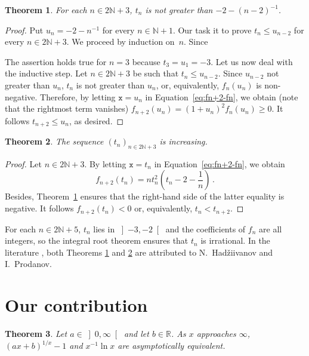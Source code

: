 \documentclass[12pt]{article}
\newcommand{\bR}{\mathbb{R}}
\newcommand{\bN}{\mathbb{N}}
\newcommand{\gtint}[1]{\left] #1, \infty \right[}
\newcommand{\ttx}{\mathtt{x}}
\newtheorem{theorem}{Theorem}
\begin{document}
 \begin{theorem} \label{thm:HP-upper}
   For each $n \in 2 \bN + 3$, $t_n$ is not greater than $- 2 - {(n - 2)}^{-1}$.
 \end{theorem}

 \begin{proof}
   Put $u_n = - 2 - n^{-1}$ for every $n \in \bN + 1$.
   Our task it to prove $t_n \le u_{n - 2}$ for every $n \in 2 \bN + 3$.
   We proceed by induction on~$n$.
   Since
   
   The assertion holds true for $n = 3$ because $t_3 = u_1 = - 3$.
   Let us now deal with the inductive step.
   Let $n \in 2 \bN + 3$ be such that $t_n \le u_{n - 2}$.
   Since $u_{n - 2}$ not greater than $u_n$, $t_n$ is not greater than $u_n$, or, equivalently, $f_n(u_n)$ is non-negative.
   Therefore,  
   by letting $\ttx = u_n$ in Equation~\eqref{eq:fn+2-fn}, we obtain (note that the rightmost term vanishes)
   $f_{n + 2}(u_n) = {( 1 + u_n )}^2 f_n(u_n) \ge 0$.
   It follows $t_{n + 2} \le u_n$, as desired.
 \end{proof}
 
 
 
\begin{theorem} \label{thm:HP-tn-increase} 
  The sequence $\left( t_n \right)_{n \in 2 \bN + 3}$ is increasing.
 \end{theorem} 

 \begin{proof}
 Let $n \in 2 \bN + 3$.
 By letting $\ttx = t_n$ in Equation~\eqref{eq:fn+2-fn}, we obtain
 $$ 
f_{n + 2} (t_n) = n t_n^2 \left(t_n - 2 - \frac{1}{n} \right) \, .
$$
Besides, Theorem~\ref{thm:HP-upper} ensures that the right-hand side of the latter equality is negative.
It follows $f_{n + 2} (t_n) < 0$ or, equivalently, $t_n < t_{n + 2}$.
\end{proof}

For each $n \in 2 \bN + 5$, $t_n$ lies in $\left]- 3, - 2 \right[$ and the coefficients of $f_n$ are all integers,
so the integral root theorem ensures that $t_n$ is irrational.
 In the literature \cite{MitrinovicCNIA, MitrinovicAI, MitrinovicP93, MondP94},
 both Theorems \ref{thm:HP-upper} and \ref{thm:HP-tn-increase} are attributed to N.~Had\v{z}iivanov and I.~Prodanov.

\section{Our contribution}

\begin{theorem}
  Let $a \in \gtint{0}$ and let $b \in \bR$.
 As $x$ approaches $\infty$, 
 ${(a x + b)}^{1 / x} - 1$
 and
 $x^{-1} \ln x$ are asymptotically equivalent.
\end{theorem}
\end{document}
